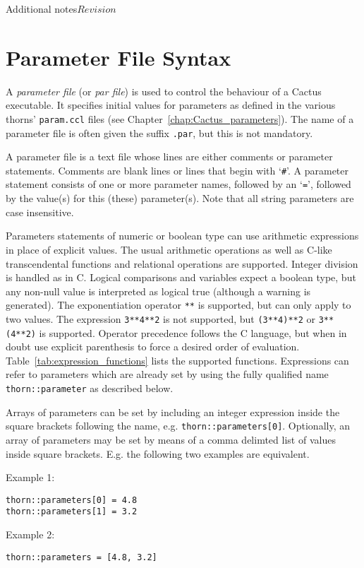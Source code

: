 \begin{cactuspart}{Additional notes}{}{$Revision$}
\section{Parameter File Syntax}
\label{sec:Parameter_File}

A \textit{parameter file} (or \textit{par file}) is used to control the
behaviour of a Cactus executable.  It specifies initial values for parameters
as defined in the various thorns' \texttt{param.ccl} files
(see Chapter~\ref{chap:Cactus_parameters}).
The name of a parameter file is often given the suffix \texttt{.par}, but
this is not mandatory.

A parameter file is a text file whose lines are either comments
or parameter statements.
Comments are blank lines or lines that begin with 
`\texttt{\#}'.
A parameter statement
consists of one or more parameter names, followed by
an `\texttt{=}', followed by the value(s) for this (these) parameter(s).
Note that all string parameters are case insensitive.

Parameters statements of numeric or boolean type can use arithmetic
expressions in place of explicit values. The usual arithmetic operations
as well as C-like transcendental functions and relational operations are
supported. Integer division is handled as in C. Logical comparisons and
variables expect a boolean type, but any non-null value is
interpreted as logical true (although a warning is generated).
The exponentiation operator \verb|**| is supported, but can only apply to two values.
The expression \verb|3**4**2| is not supported, but \verb|(3**4)**2| or
\verb|3**(4**2)| is supported. 
Operator precedence follows the C language, but when in doubt use explicit
parenthesis to force a desired order of evaluation.
Table~\ref{tab:expression_functions} lists the supported functions.
Expressions can refer to parameters which are already set by using the fully qualified
name \texttt{thorn::parameter} as described below.

Arrays of parameters can be set by including an integer expression inside
the square brackets following the name, e.g. \texttt{thorn::parameters[0]}.
Optionally, an array of parameters may be set by means of a comma delimted
list of values inside square brackets. E.g. the following two examples
are equivalent.

Example 1:
\begin{verbatim}
thorn::parameters[0] = 4.8
thorn::parameters[1] = 3.2
\end{verbatim}

Example 2:
\begin{verbatim}
thorn::parameters = [4.8, 3.2]
\end{verbatim}


\end{cactuspart}
